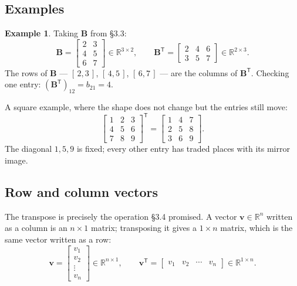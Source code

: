 \documentclass[11pt]{article}
\theoremstyle{plain}
\theoremstyle{definition}
\newtheorem{ex}{Example}[section]
\theoremstyle{remark}
\newcommand{\R}{\mathbb{R}}
\newcommand{\vc}[1]{\mathbf{#1}}        %
\newcommand{\mt}[1]{\mathbf{#1}}        %
\newcommand{\T}{^{\mathsf{T}}}          %
\begin{document}
\subsection{Examples}
\begin{ex}
Taking $\mt{B}$ from \S3.3:
\[
  \mt{B}=\begin{bmatrix}2&3\\4&5\\6&7\end{bmatrix}\in\R^{3\times2},
  \qquad
  \mt{B}\T=\begin{bmatrix}2&4&6\\3&5&7\end{bmatrix}\in\R^{2\times3} .
\]
The rows of $\mt{B}$ --- $[\,2,3\,]$, $[\,4,5\,]$, $[\,6,7\,]$ --- are the
columns of $\mt{B}\T$. Checking one entry: $(\mt{B}\T)_{12}=b_{21}=4$.
\ \checkmark

A square example, where the shape does not change but the entries still move:
\[
  \begin{bmatrix}1&2&3\\4&5&6\\7&8&9\end{bmatrix}\T
  =\begin{bmatrix}1&4&7\\2&5&8\\3&6&9\end{bmatrix} .
\]
The diagonal $1,5,9$ is fixed; every other entry has traded places with its
mirror image.
\end{ex}

\subsection{Row and column vectors}
The transpose is precisely the operation \S3.4 promised. A vector
$\vc{v}\in\R^{n}$ written as a column is an $n\times1$ matrix; transposing it
gives a $1\times n$ matrix, which is the same vector written as a row:
\[
  \vc{v}=\begin{bmatrix}v_1\\v_2\\\vdots\\v_n\end{bmatrix}\in\R^{n\times1},
  \qquad
  \vc{v}\T=\begin{bmatrix}v_1&v_2&\cdots&v_n\end{bmatrix}\in\R^{1\times n} .
\]
\end{document}
